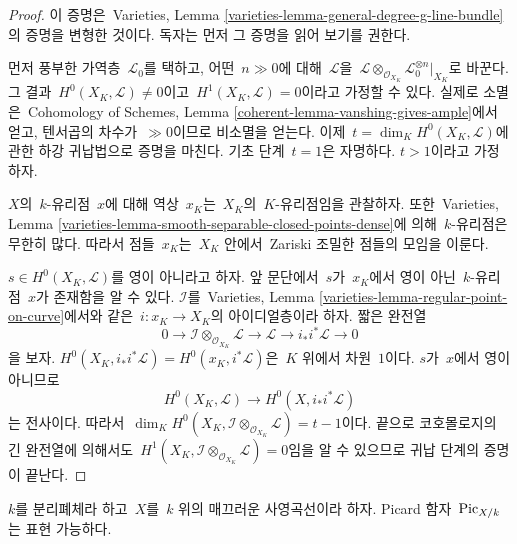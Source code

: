 \begin{proof}
이 증명은\  Varieties, Lemma
\ref{varieties-lemma-general-degree-g-line-bundle}의 증명을 변형한 것이다.
독자는 먼저 그 증명을 읽어 보기를 권한다.

\medskip\noindent
먼저 풍부한 가역층\  $\mathcal{L}_0$를 택하고, 어떤\  $n \gg 0$에 대해\ 
$\mathcal{L}$을\ 
$\mathcal{L} \otimes_{\mathcal{O}_{X_K}} \mathcal{L}_0^{\otimes n}|_{X_K}$로
바꾼다. 그 결과\  $H^0(X_K, \mathcal{L}) \not = 0$이고\ 
$H^1(X_K, \mathcal{L}) = 0$이라고 가정할 수 있다. 실제로 소멸은\ 
Cohomology of Schemes, Lemma
\ref{coherent-lemma-vanshing-gives-ample}에서 얻고, 텐서곱의 차수가\ 
$\gg 0$이므로 비소멸을 얻는다. 이제\ 
$t = \dim_K H^0(X_K, \mathcal{L})$에 관한 하강 귀납법으로 증명을
마친다. 기초 단계\  $t = 1$은 자명하다. $t > 1$이라고 가정하자.

\medskip\noindent
$X$의\  $k$-유리점\  $x$에 대해 역상\  $x_K$는\  $X_K$의\  $K$-유리점임을
관찰하자. 또한\  Varieties, Lemma
\ref{varieties-lemma-smooth-separable-closed-points-dense}에 의해\ 
$k$-유리점은 무한히 많다. 따라서 점들\  $x_K$는\  $X_K$ 안에서\  Zariski
조밀한 점들의 모임을 이룬다.

\medskip\noindent
$s \in H^0(X_K, \mathcal{L})$를 영이 아니라고 하자. 앞 문단에서\ 
$s$가\  $x_K$에서 영이 아닌\  $k$-유리점\  $x$가 존재함을 알 수 있다.
$\mathcal{I}$를\  Varieties, Lemma
\ref{varieties-lemma-regular-point-on-curve}에서와 같은\ 
$i : x_K \to X_K$의 아이디얼층이라 하자. 짧은 완전열
$$
0 \to \mathcal{I} \otimes_{\mathcal{O}_{X_K}} \mathcal{L} \to
\mathcal{L} \to i_*i^*\mathcal{L} \to 0
$$
을 보자. $H^0(X_K, i_*i^*\mathcal{L}) = H^0(x_K, i^*\mathcal{L})$은\ 
$K$ 위에서 차원\  $1$이다. $s$가\  $x$에서 영이 아니므로
$$
H^0(X_K, \mathcal{L}) \longrightarrow H^0(X, i_*i^*\mathcal{L})
$$
는 전사이다. 따라서\ 
$\dim_K H^0(X_K, \mathcal{I} \otimes_{\mathcal{O}_{X_K}} \mathcal{L}) = t - 1$이다.
끝으로 코호몰로지의 긴 완전열에 의해서도\ 
$H^1(X_K, \mathcal{I} \otimes_{\mathcal{O}_{X_K}} \mathcal{L}) = 0$임을
알 수 있으므로 귀납 단계의 증명이 끝난다.
\end{proof}

\begin{proposition}
\label{proposition-pic-curve}
$k$를 분리폐체라 하고\  $X$를\  $k$ 위의 매끄러운 사영곡선이라 하자.
Picard 함자\  $\mathrm{Pic}_{X/k}$는 표현 가능하다.
\end{proposition}

